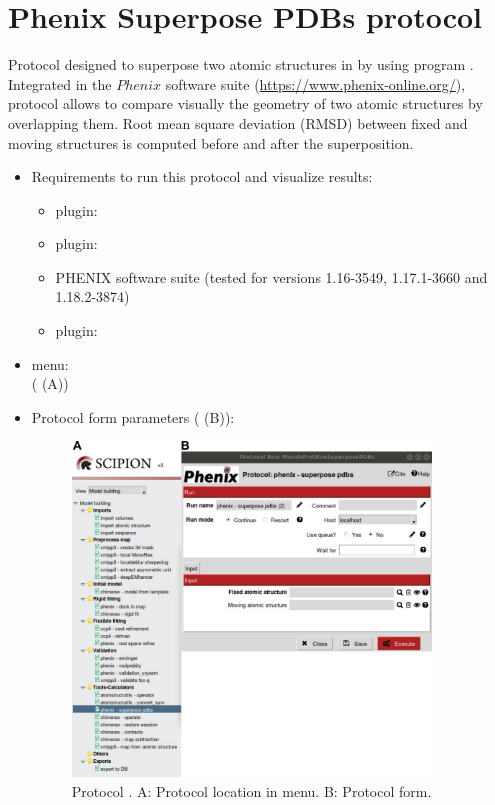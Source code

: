 \section{Phenix Superpose PDBs protocol}
\label{app:superposePdbsProtocol}%
Protocol designed to superpose two atomic structures in \scipion by using  program \citep{zwartUrl}. Integrated in the $Phenix$ software suite (\url{https://www.phenix-online.org/}), \phenix protocol  allows to compare visually the geometry of two atomic structures by overlapping them. Root mean square deviation (RMSD) between fixed and moving structures is computed before and after the superposition. 

\begin{itemize}
 \item Requirements to run this protocol and visualize results:
    \begin{itemize}
        \item \scipion plugin: 
        \item \scipion plugin: 
        \item PHENIX software suite (tested for versions 1.16-3549, 1.17.1-3660 and 1.18.2-3874)
        \item \scipion plugin: 
    \end{itemize}
 \item \scipion menu:\\
   ( (A))
  
 \item Protocol form parameters ( (B)):
 
 \begin{figure}[H]
     \centering 
     \captionsetup{width=.9\linewidth} 
     \includegraphics[width=0.90\textwidth]{Images_appendix/Fig153.pdf}
     \caption{Protocol . A: Protocol location in \scipion menu. B: Protocol form.}
     \label{fig:app_protocol_superpose_pdbs_1}
    \end{figure}
    

\end{itemize}
